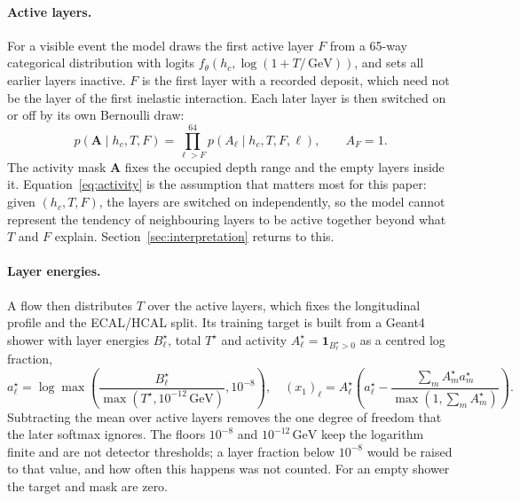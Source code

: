 \documentclass[11pt]{article}
\newcommand{\GeV}{\,\mathrm{GeV}}
\begin{document}
\paragraph{Active layers.} For a visible event the model draws the first active layer $F$ from a 65-way categorical distribution with logits $f_\theta(h_c,\log(1+T/\GeV))$, and sets all earlier layers inactive. $F$ is the first layer with a recorded deposit, which need not be the layer of the first inelastic interaction. Each later layer is then switched on or off by its own Bernoulli draw:
\begin{equation}
 p(\mathbf A\mid h_c,T,F)=\prod_{\ell>F}^{64}p(A_\ell\mid h_c,T,F,\ell),
 \qquad A_F=1.
 \label{eq:activity}
\end{equation}
The activity mask $\mathbf A$ fixes the occupied depth range and the empty layers inside it. Equation~\eqref{eq:activity} is the assumption that matters most for this paper: given $(h_c,T,F)$, the layers are switched on independently, so the model cannot represent the tendency of neighbouring layers to be active together beyond what $T$ and $F$ explain. Section~\ref{sec:interpretation} returns to this.

\paragraph{Layer energies.} A flow then distributes $T$ over the active layers, which fixes the longitudinal profile and the ECAL/HCAL split. Its training target is built from a Geant4 shower with layer energies $B_\ell^\star$, total $T^\star$ and activity $A_\ell^\star=\mathbf 1_{B_\ell^\star>0}$ as a centred log fraction,
\begin{equation}
 a_\ell^\star=\log\max\!\left(
 \frac{B_\ell^\star}{\max(T^\star,10^{-12}\GeV)},10^{-8}\right),
 \quad (x_1)_\ell=A_\ell^\star\left(
 a_\ell^\star-\frac{\sum_m A_m^\star a_m^\star}
 {\max(1,\sum_m A_m^\star)}\right).
 \label{eq:profile_target}
\end{equation}
Subtracting the mean over active layers removes the one degree of freedom that the later softmax ignores. The floors $10^{-8}$ and $10^{-12}\GeV$ keep the logarithm finite and are not detector thresholds; a layer fraction below $10^{-8}$ would be raised to that value, and how often this happens was not counted. For an empty shower the target and mask are zero.
\end{document}
